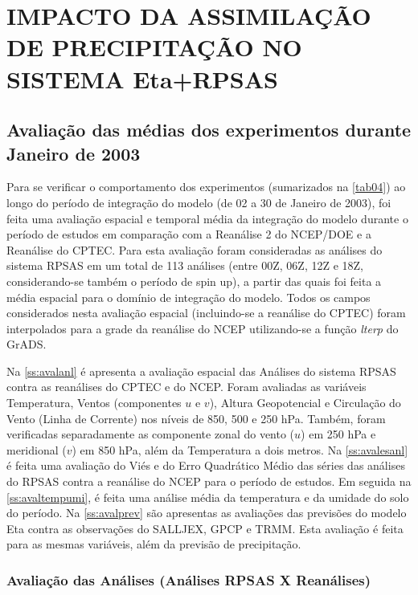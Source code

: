 \hypertarget{estilo:capitulo}{}
\chapter{IMPACTO DA ASSIMILAÇÃO DE PRECIPITAÇÃO NO SISTEMA Eta+RPSAS}
\label{ss:cap3}

\section{Avaliação das médias dos experimentos durante Janeiro de 2003}
\label{ss:avalmedia}

Para se verificar o comportamento dos experimentos (sumarizados na \autoref{tab04}) ao longo do período de integração do modelo (de 02 a 30 de Janeiro de 2003), foi feita uma avaliação espacial e temporal média da integração do modelo durante o período de estudos em comparação com a Reanálise 2 do NCEP/DOE e a Reanálise do CPTEC. Para esta avaliação foram consideradas as análises do sistema RPSAS em um total de 113 análises (entre 00Z, 06Z, 12Z e 18Z, considerando-se também  o período de spin up), a partir das quais foi feita a média espacial para o domínio de integração do modelo. Todos os campos considerados nesta avaliação espacial (incluindo-se a reanálise do CPTEC) foram interpolados para a grade da reanálise do NCEP utilizando-se a função \textit{lterp} do GrADS. 

Na \autoref{ss:avalanl} é apresenta a avaliação espacial das Análises do sistema RPSAS contra as reanálises do CPTEC e do NCEP. Foram avaliadas as variáveis Temperatura, Ventos (componentes $u$ e $v$), Altura Geopotencial e Circulação do Vento (Linha de Corrente) nos níveis de 850, 500 e 250 hPa. Também, foram verificadas separadamente as componente zonal do vento ($u$) em 250 hPa e meridional ($v$) em 850 hPa, além da Temperatura a dois metros. Na \autoref{ss:avalesanl} é feita uma avaliação do Viés e do Erro Quadrático Médio das séries das análises do RPSAS contra a reanálise do NCEP para o período de estudos. Em seguida na \autoref{ss:avaltempumi}, é feita uma análise média da temperatura e da umidade do solo do período. Na \autoref{ss:avalprev} são apresentas as avaliações das previsões do modelo Eta contra as observações do SALLJEX, GPCP e TRMM. Esta avaliação é feita para as mesmas variáveis, além da previsão de precipitação.

\subsection{Avaliação das Análises (Análises RPSAS X Reanálises)}
\label{ss:avalanl}

